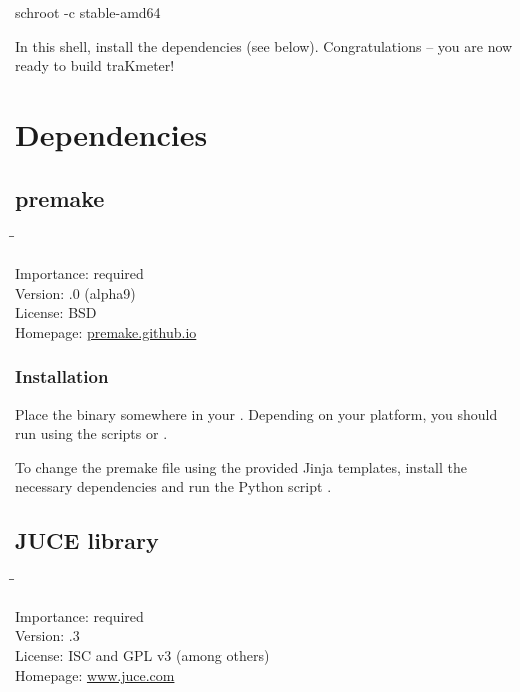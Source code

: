 \begin{Verbatim64}
  schroot -c stable-amd64
\end{Verbatim64}

In this  shell, install the dependencies (see below).
Congratulations -- you are now ready to build traKmeter!

\section{Dependencies}

\subsection{premake}
\label{sec:dependencies_premake}

\begin{tabbing}
  \hspace*{6em}\=\=\kill

  Importance:  \> required \\
  Version:     .0 (alpha9) \\
  License:     \> BSD \\
  Homepage:    \> \href{https://premake.github.io/}{premake.github.io}
\end{tabbing}

\subsubsection{Installation}

Place the binary somewhere in your .  Depending on your
platform, you should run  using the scripts
 or .

To change the premake file using the provided Jinja templates, install
the necessary dependencies and run the Python script
.

\newpage %

\subsection{JUCE library}

\begin{tabbing}
  \hspace*{6em}\=\=\kill

  Importance:  \> required \\
  Version:     .3 \\
  License:     \> ISC and GPL v3 (among others) \\
  Homepage:    \> \href{http://www.juce.com/}{www.juce.com}
\end{tabbing}

